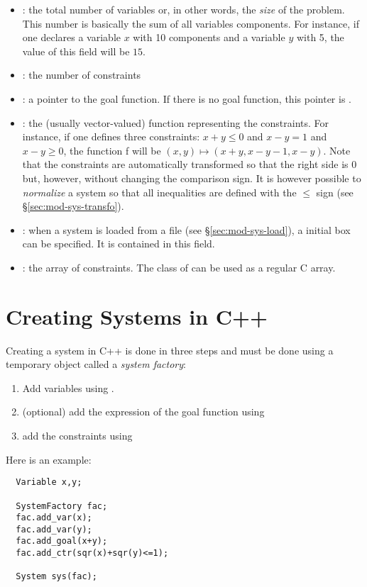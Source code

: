 \begin{itemize}
\item {} : the total number of variables or, in other words, the
{\it size} of the problem. This number is basically the sum of all variables components. For instance,
if one declares a variable $x$ with 10 components and a variable $y$ with 5, the value of this field
will be $15$.
\item {} : the number of constraints
\item {} : a pointer to the goal function. If there is no goal function, this
pointer is .
\item {} : the (usually vector-valued) function representing the constraints. 
For instance, if one defines three constraints: $x+y\leq0$ and $x-y=1$ and $x-y\geq0$, the function f will be 
$(x,y)\mapsto (x+y,x-y-1,x-y)$. Note that the constraints are automatically transformed so that the right side 
is 0 but, however, without changing the comparison sign. It is however possible to {\it normalize} a system so that
all inequalities are defined with the $\le$ sign (see \S\ref{sec:mod-sys-transfo}).
\item {} : when a system is loaded from a file (see \S\ref{sec:mod-sys-load}),
a initial box can be specified. It is contained in this field.
\item {} : the array of constraints. The  class of \ibex can
be used as a regular C array.
\end{itemize}

\section{Creating Systems in C++}

Creating a system in C++ is done in three steps and must be done using a temporary object called a {\it system factory}:
\begin{enumerate}
\item Add variables using .
\item (optional) add the expression of the goal function using 
\item add the constraints using 
\end{enumerate}

Here is an example:

\begin{lstlisting}
  Variable x,y;

  SystemFactory fac;
  fac.add_var(x);
  fac.add_var(y);
  fac.add_goal(x+y);
  fac.add_ctr(sqr(x)+sqr(y)<=1);

  System sys(fac);
\end{lstlisting}

